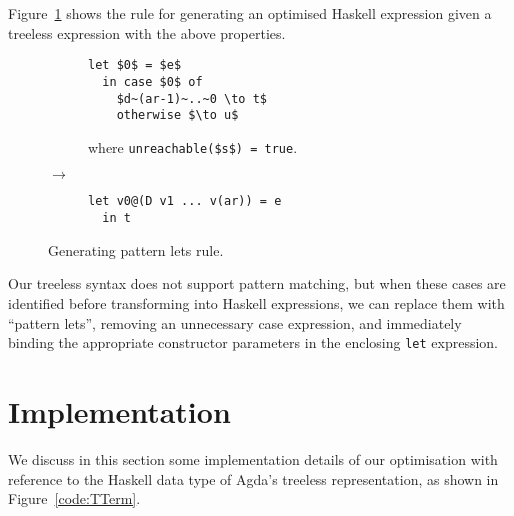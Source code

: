 Figure~\ref{fig:plet_rule} shows the rule for generating an optimised Haskell expression given a treeless expression with the above properties.

\begin{figure}[h]
\centering
\begin{subfigure}{.47\textwidth}
  \begin{lstlisting}[style=math]
  let $0$ = $e$
  in case $0$ of
    $d~(ar-1)~..~0 \to t$
    otherwise $\to u$
  \end{lstlisting}
  where \lstinline[style=math]{unreachable($s$) = true}.
\end{subfigure}
{\large$\to$}
\begin{subfigure}{.47\textwidth}
  \begin{lstlisting}[style=blockhaskell]
  let v0@(D v1 ... v(ar)) = e
  in t
  \end{lstlisting}
\end{subfigure}
\caption{Generating pattern lets rule.}
\label{fig:plet_rule}
\end{figure}


Our treeless syntax does not support pattern matching, but when these cases are identified before transforming into Haskell expressions, we can replace them with ``pattern lets'', removing an unnecessary case expression, and immediately binding the appropriate constructor parameters in the enclosing \lstinline{let} expression.




\section{Implementation}
\label{sec:implementation}

We discuss in this section some implementation details of our optimisation with reference to the Haskell data type of Agda's treeless representation, as shown in Figure~\ref{code:TTerm}.

